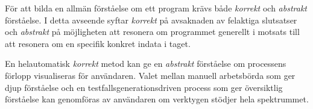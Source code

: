 För att bilda en allmän förståelse om ett program krävs både \textit{korrekt} och
\textit{abstrakt} förståelse. I detta avseende syftar \textit{korrekt} på
avsaknaden av felaktiga slutsatser och \textit{abstrakt} på möjligheten att
resonera om programmet generellt i motsats till att resonera om en specifik
konkret indata i taget.




En helautomatisk \textit{korrekt} metod kan ge en \textit{abstrakt} förståelse
om processens förlopp visualiseras för användaren. Valet mellan manuell
arbetsbörda som ger djup förståelse och en testfallsgenerationsdriven process
som ger översiktlig förståelse kan genomföras av användaren om verktygen stödjer
hela spektrummet.

